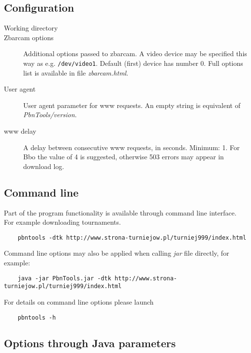 \documentclass[polish,a4paper,11pt,oneside]{article}
\begin{document}

\subsection{Configuration} \label{konfig} %

\begin{description}
\item[Working directory]
\item[Zbarcam options]
  Additional options passed to zbarcam.
  A video device may be specified this way as e.g. \verb!/dev/video1!.
  Default (first) device has number 0.
  Full options list is available in file {\em zbarcam.html}.
\item[User agent]
  User agent parameter for www requests. An empty string is equivalent of
  {\em PbnTools/version}.
\item[www delay]
  A delay between consecutive www requests, in seconds.
  Minimum: 1. For Bbo the value of 4 is suggested,
  otherwise 503 errors may appear in download log.

\end{description}


\subsection{Command line} \label{commLine} %

Part of the program functionality is available through command line
interface. For example downloading tournaments.

\begin{verbatim}
    pbntools -dtk http://www.strona-turniejow.pl/turniej999/index.html
\end{verbatim}

Command line options may also be applied when calling {\em jar} file
directly, for example:

\begin{verbatim}
    java -jar PbnTools.jar -dtk http://www.strona-turniejow.pl/turniej999/index.html
\end{verbatim}

For details on command line options please launch

\begin{verbatim}
    pbntools -h
\end{verbatim}

\subsection{Options through Java parameters}
\end{document}
